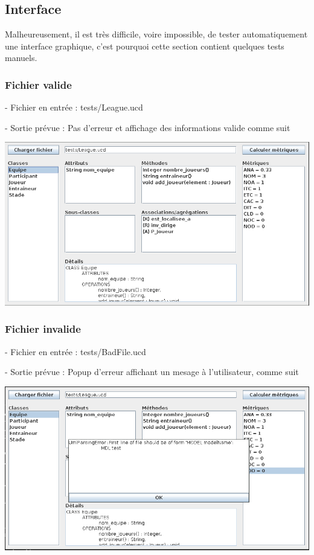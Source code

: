 \documentclass[letter,french]{report}
\begin{document}
  \subsection*{Interface}
  Malheureusement, il est très difficile, voire impossible, de tester
  automatiquement une interface graphique, c'est pourquoi cette section
  contient quelques tests manuels.

  \subsubsection*{Fichier valide}
  - Fichier en entrée : tests/League.ucd

  - Sortie prévue : Pas d'erreur et affichage des informations valide comme suit

	\includegraphics[scale=.4]{images/ExecutionNormale.png}

  \subsubsection*{Fichier invalide}
  - Fichier en entrée : tests/BadFile.ucd

  - Sortie prévue : Popup d'erreur affichant un mesage à l'utilisateur, comme suit

	\includegraphics[scale=.4]{images/ErrorPopup.png}
\end{document}
